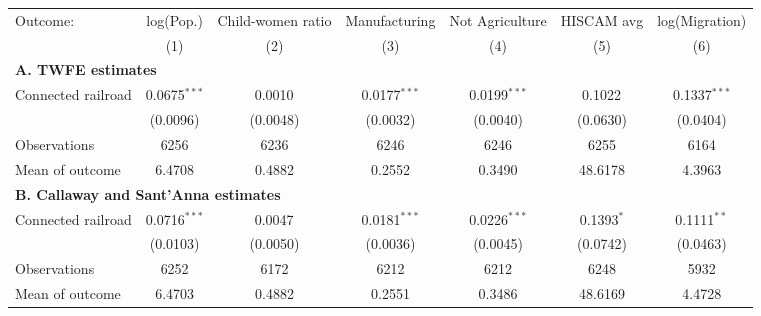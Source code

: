 \begin{tabular}{lcccccc}
  \toprule
  Outcome: & log(Pop.) & Child-women ratio & Manufacturing & Not Agriculture & HISCAM avg & log(Migration) \\
           & (1) & (2) & (3) & (4) & (5) & (6) \\
  \midrule
  \multicolumn{7}{l}{\textbf{A. TWFE estimates}}\\
  Connected railroad &  0.0675$^{***}$ & 0.0010$^{}$ & 0.0177$^{***}$ & 0.0199$^{***}$ & 0.1022$^{}$ & 0.1337$^{***}$  \\
                    &  (0.0096) & (0.0048) & (0.0032) & (0.0040) & (0.0630) & (0.0404)  \\
  \cmidrule(lr){2-7}
  Observations      &  6256 & 6236 & 6246 & 6246 & 6255 & 6164  \\
  Mean of outcome   &  6.4708 & 0.4882 & 0.2552 & 0.3490 & 48.6178 & 4.3963  \\
  \midrule
  \multicolumn{7}{l}{\textbf{B. Callaway and Sant'Anna estimates}}\\
  Connected railroad &  0.0716$^{***}$ & 0.0047$^{}$ & 0.0181$^{***}$ & 0.0226$^{***}$ & 0.1393$^{*}$ & 0.1111$^{**}$  \\
                    &  (0.0103) & (0.0050) & (0.0036) & (0.0045) & (0.0742) & (0.0463)  \\
  \cmidrule(lr){2-7}
  Observations      &  6252 & 6172 & 6212 & 6212 & 6248 & 5932  \\
  Mean of outcome   &  6.4703 & 0.4882 & 0.2551 & 0.3486 & 48.6169 & 4.4728  \\
  \bottomrule
\end{tabular}
